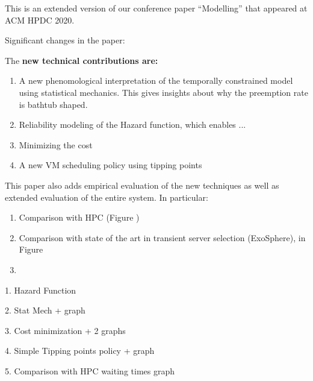 
This is an extended version of our conference paper ``Modelling'' that appeared at ACM HPDC 2020.

Significant changes in the paper:

The \textbf{new technical contributions are:}

\begin{enumerate}
\item A new phenomological interpretation of the temporally constrained model using statistical mechanics. This gives insights about why the preemption rate is bathtub shaped.

\item   Reliability modeling of the Hazard function, which enables ...

\item Minimizing the cost

\item A new VM scheduling policy using tipping points

\end{enumerate}

This paper also adds empirical evaluation of the new techniques as well as extended evaluation of the entire system. In particular:

\begin{enumerate}
\item Comparison with HPC (Figure )
\item Comparison with state of the art in transient server selection (ExoSphere), in Figure
\item 
\end{enumerate}

1. Hazard Function

2. Stat Mech + graph

3. Cost minimization + 2 graphs

4. Simple Tipping points policy  + graph

5. Comparison with HPC waiting times graph

